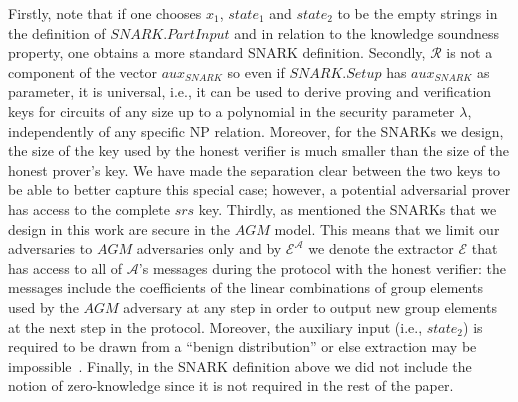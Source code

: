 \noindent Firstly, note that if one chooses $x_1$, $\mathit{state_1}$ and $\mathit{state_2}$ to be the empty strings in the definition of 
$\mathit{SNARK.PartInput}$ and in relation to the knowledge soundness property, one obtains a more standard SNARK definition.
Secondly, $\mathcal{R}$ is not a component of the vector $\mathit{aux_{\mathit{SNARK}}}$ so even if $\mathit{SNARK.Setup}$ has 
$\mathit{aux_{\mathit{SNARK}}}$ as parameter, it is universal, 
i.e., it can be used to derive proving and verification keys for circuits of any size up to a polynomial in the security parameter $\lambda$,   
independently of any specific NP relation. Moreover, for the SNARKs we design, the size of the key used by 
the honest verifier is much smaller than the size of the honest prover's key. We have made the separation clear between the two keys to be able 
to better capture this special case; however, a potential adversarial prover has access to the complete $\mathit{srs}$ key. 
Thirdly, as mentioned the SNARKs that we design in this work are secure in the $\mathit{AGM}$ model. This means that we limit our adversaries to 
$\mathit{AGM}$ adversaries only and by $\mathcal{E}^{\mathcal{A}}$ we denote the extractor $\mathcal{E}$ that has access to all of 
$\mathcal{A}$'s messages during the protocol with the honest verifier: the messages include the coefficients of the linear combinations of 
group elements used by the $\mathit{AGM}$ adversary at any step in order to output new group elements at the next step in the protocol. 
Moreover, the auxiliary input (i.e., $\mathit{state_2}$) is required to be drawn from a ``benign distribution'' or else extraction may be 
impossible~\cite{extractability_limits_1,extractability_limits_2}. 
Finally, in the SNARK definition above we did not include the notion of zero-knowledge since it is not required in the rest of the paper.